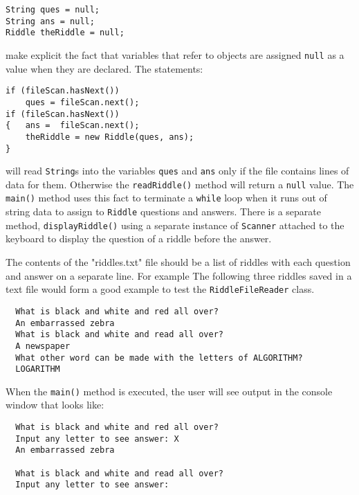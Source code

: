 \begin{jjjlisting}
\begin{lstlisting}
String ques = null;
String ans = null;
Riddle theRiddle = null; 
\end{lstlisting}
\end{jjjlisting}

\noindent make explicit the fact that variables that refer to objects
are assigned {\tt null} as a value when they are declared.  The statements:

\begin{jjjlisting}
\begin{lstlisting}
if (fileScan.hasNext())
    ques = fileScan.next();
if (fileScan.hasNext())
{   ans =  fileScan.next();
    theRiddle = new Riddle(ques, ans);
} 
\end{lstlisting}
\end{jjjlisting}

\noindent will read {\tt String}s into the variables {\tt ques} and {\tt ans}
only if the file contains lines of data for them.  Otherwise the 
{\tt readRiddle()} method will return a {\tt null} value.  The {\tt main()}
method uses this fact to terminate a {\tt while} loop when it runs out
of string data to assign to {\tt Riddle} questions and answers. There is
a separate method,  {\tt displayRiddle()} using a separate instance of
{\tt Scanner} attached to the keyboard to display the question 
of a riddle before the answer. 

The contents of the "riddles.txt" file should be a list of riddles
with each question and answer on a separate line.
For example The following three riddles  saved in a text file would form
a good example to test the {\tt RiddleFileReader} class.

\begin{jjjlisting}[27pc]
\begin{lstlisting}
  What is black and white and red all over?
  An embarrassed zebra
  What is black and white and read all over?
  A newspaper
  What other word can be made with the letters of ALGORITHM?
  LOGARITHM
\end{lstlisting}
\end{jjjlisting}

When the {\tt main()} method is executed, the user will see output
in the console window that looks like:

\begin{jjjlisting}
\begin{lstlisting}
  What is black and white and red all over?
  Input any letter to see answer: X
  An embarrassed zebra
  
  What is black and white and read all over?
  Input any letter to see answer:
\end{lstlisting}
\end{jjjlisting}

